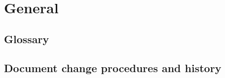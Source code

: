 \chapter{General} \label{chp:general}
	\begin{comment}
		Introduce the following subordinate sections. This section includes the Glossary and document change
		procedures.
	\end{comment}

\section{Glossary} \label{s:general:glossary}
	\begin{comment}
		Provide an alphabetical list of terms that may require definition for the users of the MTP with their
		corresponding definitions. This includes acronyms. There may also be a reference to a project glossary,
		possibly posted online.
	\end{comment}
\section{Document change procedures and history} \label{s:general:document-change-procedures-and-history}
	\begin{comment}
		Specify the means for identifying, approving, implementing, and recording changes to the MTP. This
		may be recorded in an overall configuration management system that is documented in a Configuration
		Management Plan that is referenced here. The change procedures need to include a log of all of the
		changes that have occurred since the inception of the MTP. This may include a Document ID (every
		testing document should have a unique ID connected to the system project), version number
		(sequential starting with first approved version), description of document changes, reason for changes
		(e.g., audit comments, team review, system changes), name of person making changes, and role of
		person to document (e.g., document author, project manager, system owner). This information is
		commonly put on an early page in the document (after the title page and before Section 1). Some
		organizations put this information at the end of the document.
	\end{comment}